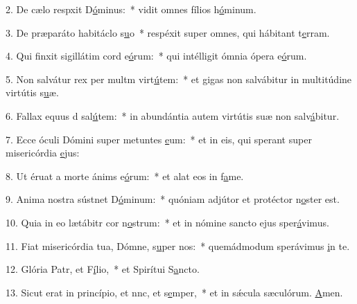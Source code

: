 2. De cælo respxit D\uline{ó}minus:~* vidit omnes fílios h\uline{ó}minum.\par 
3. De præparáto habitáclo s\uline{u}o~* respéxit super omnes, qui hábitant t\uline{e}rram.\par 
4. Qui finxit sigillátim cord e\uline{ó}rum:~* qui intélligit ómnia ópera e\uline{ó}rum.\par 
5. Non salvátur rex per multm virt\uline{ú}tem:~* et gigas non salvábitur in multitúdine virtútis s\uline{u}æ.\par 
6. Fallax equus d sal\uline{ú}tem:~* in abundántia autem virtútis suæ non salv\uline{á}bitur.\par 
7. Ecce óculi Dómini super metuntes \uline{e}um:~* et in eis, qui sperant super misericórdia \uline{e}jus:\par 
8. Ut éruat a morte ánims e\uline{ó}rum:~* et alat eos in f\uline{a}me.\par 
9. Anima nostra sústnet D\uline{ó}minum:~* quóniam adjútor et protéctor n\uline{o}ster est.\par 
10. Quia in eo lætábitr cor n\uline{o}strum:~* et in nómine sancto ejus sper\uline{á}vimus.\par 
11. Fiat misericórdia tua, Dómne, s\uline{u}per nos:~* quemádmodum sperávimus \uline{i}n te.\par 
12. Glória Patr, et F\uline{í}lio,~* et Spirítui S\uline{a}ncto.\par 
13. Sicut erat in princípio, et nnc, et s\uline{e}mper,~* et in sǽcula sæculórum. \uline{A}men.\par 

